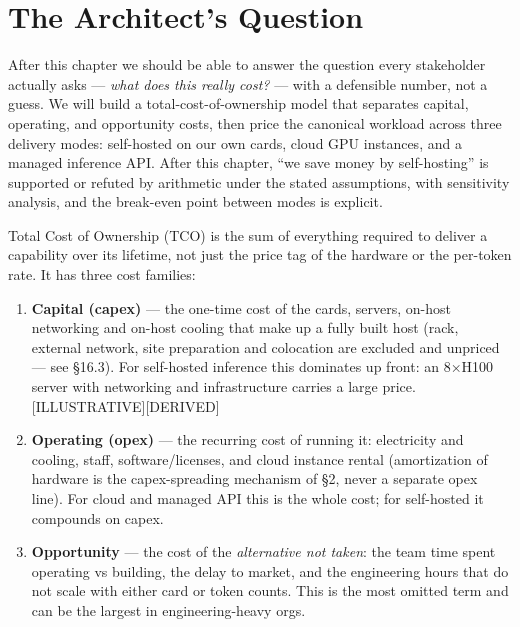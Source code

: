 \section*{The Architect's Question}\label{the-architects-question}

After this chapter we should be able to answer the question every
stakeholder actually asks --- \emph{what does this really cost?} ---
with a defensible number, not a guess. We will build a
total-cost-of-ownership model that separates capital, operating, and
opportunity costs, then price the canonical workload across three
delivery modes: self-hosted on our own cards, cloud GPU instances, and a
managed inference API. After this chapter, ``we save money by
self-hosting'' is supported or refuted by arithmetic under the stated
assumptions, with sensitivity analysis, and the break-even point between
modes is explicit.

\label{concept}


Total Cost of Ownership (TCO) is the sum of everything required to
deliver a capability over its lifetime, not just the price tag of the
hardware or the per-token rate. It has three cost families:

\begin{enumerate}
\def\labelenumi{\arabic{enumi}.}
\item
  \textbf{Capital (capex)} --- the one-time cost of the cards, servers,
  on-host networking and on-host cooling that make up a fully built host
  (rack, external network, site preparation and colocation are excluded
  and unpriced --- see §16.3). For self-hosted inference this dominates
  up front: an 8×H100 server with networking and infrastructure carries
  a large price. \mbox{{[}ILLUSTRATIVE{]}}\hspace{0pt}\mbox{{[}DERIVED{]}}
\item
  \textbf{Operating (opex)} --- the recurring cost of running it:
  electricity and cooling, staff, software/licenses, and cloud instance
  rental (amortization of hardware is the capex-spreading mechanism of
  §2, never a separate opex line). For cloud and managed API this is the
  whole cost; for self-hosted it compounds on capex.
\item
  \textbf{Opportunity} --- the cost of the \emph{alternative not taken}:
  the team time spent operating vs building, the delay to market, and
  the engineering hours that do not scale with either card or token
  counts. This is the most omitted term and can be the largest in
  engineering-heavy orgs.
\end{enumerate}

